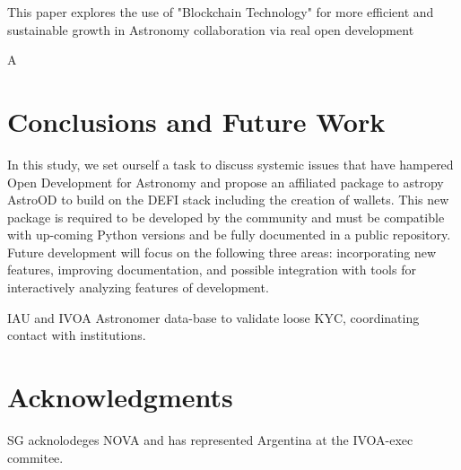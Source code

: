 \documentclass[final,5p,times,twocolumn,authoryear]{elsarticle}
\begin{document}
       
This paper explores the use of "Blockchain Technology" for more efficient and sustainable growth in Astronomy collaboration via real open development

A
\section{Conclusions and Future Work}
\label{sec:5}
%
In this study, we set ourself a task to discuss systemic issues that have hampered Open Development for Astronomy and propose an affiliated package to astropy AstroOD to build on the DEFI stack including the creation of wallets. This new package is required to be developed by the community and must be compatible with up-coming Python versions and be fully documented in a public repository. 
%
Future development will focus on the following three areas: incorporating
new features, improving documentation, and 
possible integration with tools for interactively analyzing features of development.

IAU and IVOA Astronomer data-base to validate loose KYC, coordinating contact with institutions. 

\section{Acknowledgments}
SG acknolodeges NOVA and has represented Argentina at the IVOA-exec commitee.

%


\end{document}
